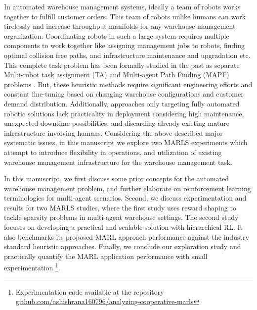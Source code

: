 \documentclass{article}
\begin{document}
In automated warehouse management systems, ideally a team of robots works together to fulfill customer orders.
This team of robots unlike humans can work tirelessly and increase throughput manifolds for any warehouse management organization.
Coordinating robots in such a large system requires multiple components to work together like assigning management jobs to robots, finding optimal collision free paths, and infrastructure maintenance and upgradation etc.
This complete task problem has been formally studied in the past as separate Multi-robot task assignment (TA) and Multi-agent Path Finding (MAPF) problems \cite{korsah2013comprehensive, stern2019multi}.
But, these heuristic methods require significant engineering efforts and constant fine-tuning based on changing warehouse configurations and customer demand distribution.
Additionally, approaches only targeting fully automated robotic solutions lack practicality in deployment considering high maintenance, unexpected downtime possibilities, and discarding already existing mature infrastructure involving humans.
Considering the above described major systematic issues, in this manuscript we explore two MARLS experiments which attempt to introduce flexibility in operations, and utilization of existing warehouse management infrastructure for the warehouse management task.


In this manuscript, we first discuss some prior concepts for the automated warehouse management problem, and further elaborate on reinforcement learning terminologies for multi-agent scenarios.
Second, we discuss experimentation and results for two MARLS studies, where the first study uses reward shaping to tackle sparsity problems in multi-agent warehouse settings.
The second study focuses on developing a practical and scalable solution with hierarchical RL.
It also benchmarks its proposed MARL approach performance against the industry standard heuristic approaches.
Finally, we conclude our exploration study and practically quantify the MARL application performance with small experimentation \footnote{Experimentation code available at the repository \href{https://github.com/ashishrana160796/analyzing-cooperative-marls}{github.com/ashishrana160796/analyzing-cooperative-marls}}.
\end{document}
